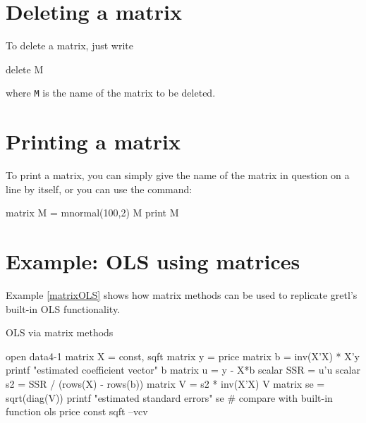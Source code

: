 \section{Deleting a matrix}
\label{matrix-delete}

To delete a matrix, just write
%
\begin{code}
delete M
\end{code}
%
where \texttt{M} is the name of the matrix to be deleted.

\section{Printing a matrix}

To print a matrix, you can simply give the name of the matrix in
question on a line by itself, or you can use the  command:
%
\begin{code}
matrix M = mnormal(100,2)
M
print M
\end{code}

\section{Example: OLS using matrices}
\label{matrix-example}

Example \ref{matrixOLS} shows how matrix methods can be used to
replicate gretl's built-in OLS functionality.

\begin{script}[htbp]
  \caption{OLS via matrix methods}
  \label{matrixOLS}
\begin{scode}
open data4-1
matrix X = { const, sqft }
matrix y = { price }
matrix b = inv(X'X) * X'y
printf "estimated coefficient vector\n"
b
matrix u = y - X*b
scalar SSR = u'u
scalar s2 = SSR / (rows(X) - rows(b))
matrix V = s2 * inv(X'X)
V
matrix se = sqrt(diag(V))
printf "estimated standard errors\n"
se
# compare with built-in function
ols price const sqft --vcv
\end{scode}
\end{script}



















